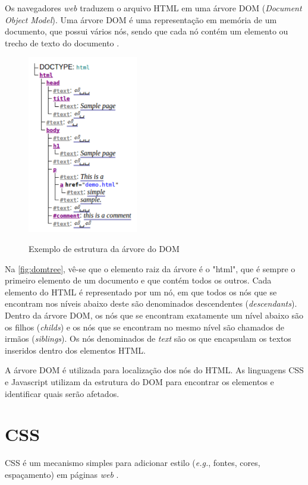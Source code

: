 Os navegadores \textit{web} traduzem o arquivo HTML em uma árvore DOM (\textit{Document Object Model}). Uma árvore DOM é uma representação em memória de um documento, que possui vários nós, sendo que cada nó contém um elemento ou trecho de texto do documento \cite{HTMLspec2014}.

\begin{figure}[!htb]
	\centering
	\caption{Exemplo de estrutura da árvore do DOM}
	\includegraphics[width=0.43\textwidth]{./04-figuras/DOMsnippet}
	\label{fig:domtree}
\end{figure}

Na \autoref{fig:domtree}, vê-se que o elemento raiz da árvore é o "html", que é sempre o primeiro elemento de um documento e que contém todos os outros. Cada elemento do HTML é representado por um nó, em que todos os nós que se encontram nos níveis abaixo deste são denominados descendentes (\textit{descendants}). Dentro da árvore DOM, os nós que se encontram exatamente um nível abaixo são os filhos (\textit{childs}) e os nós que se encontram no mesmo nível são chamados de irmãos (\textit{siblings}). Os nós denominados de \textit{text} são os que encapsulam os textos inseridos dentro dos elementos HTML.

A árvore DOM é utilizada para localização dos nós do HTML. As linguagens  CSS e Javascript utilizam da estrutura do DOM para encontrar os elementos e identificar quais serão afetados.

\section{CSS}
\label{sec:CSS}
CSS é um mecanismo simples para adicionar estilo (\textit{e.g.}, fontes, cores, espaçamento) em páginas \textit{web} \cite{W3Ccss2015}.

